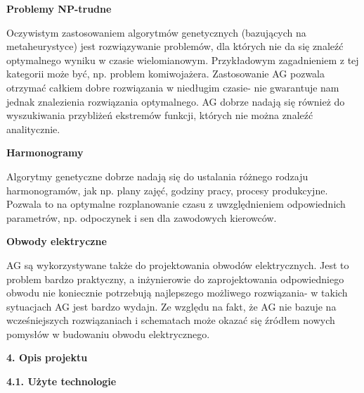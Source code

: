 \documentclass[a4paper, twoside, 12pt, justified]{article}
\begin{document}
	\begin{center}
		\textbf{Problemy NP-trudne}
	\end{center}	
	Oczywistym zastosowaniem algorytmów genetycznych (bazujących na metaheurystyce) jest rozwiązywanie problemów, dla których nie da się znaleźć optymalnego wyniku w czasie wielomianowym. Przykładowym zagadnieniem z tej kategorii może być, np. problem komiwojażera. Zastosowanie AG pozwala otrzymać całkiem dobre rozwiązania w niedługim czasie- nie gwarantuje nam jednak znalezienia rozwiązania optymalnego. AG dobrze nadają się również do wyszukiwania przybliżeń ekstremów funkcji, których nie można znaleźć analitycznie.\\

	
	\begin{center}
		\textbf{Harmonogramy}
	\end{center}
	
	Algorytmy genetyczne dobrze nadają się do ustalania różnego rodzaju harmonogramów, jak np. plany zajęć, godziny pracy, procesy produkcyjne. Pozwala to na optymalne rozplanowanie czasu z uwzględnieniem odpowiednich parametrów, np. odpoczynek i sen dla zawodowych kierowców.  
	
	
	\begin{center}
		\textbf{Obwody elektryczne}
	\end{center}

	AG są wykorzystywane także do projektowania obwodów elektrycznych. Jest to problem bardzo praktyczny, a inżynierowie do zaprojektowania odpowiedniego obwodu nie koniecznie potrzebują najlepszego możliwego rozwiązania- w takich sytuacjach AG jest bardzo wydajn. Ze względu na fakt, że AG nie bazuje na wcześniejszych rozwiązaniach i schematach może okazać się źródłem nowych pomysłów w budowaniu obwodu elektrycznego. 
	
	\newpage
	\begin{flushleft}
		\begin{large}
			\textbf{4. Opis projektu}
		\end{large}
	\end{flushleft}
	
	\vspace{5mm} %
	
	\begin{flushleft}
		\begin{large}
			\textbf{4.1. Użyte technologie}
		\end{large}
	\end{flushleft}
	\vspace{10mm} %
	
\end{document}
